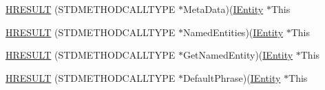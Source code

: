 \begin{DoxyCompactItemize}
\item 
\hyperlink{struct_i_entity_vtbl_aa0ba25fab034e9859b51e790274c795a}{H\+R\+E\+S\+U\+LT} (S\+T\+D\+M\+E\+T\+H\+O\+D\+C\+A\+L\+L\+T\+Y\+PE $\ast$Meta\+Data)(\hyperlink{structuredquery_8h_a9dd08456b6bfe208b5aa2ea5c533b490}{I\+Entity} $\ast$This
\item 
\hyperlink{struct_i_entity_vtbl_a513e110e6fd4b67ebf4ed83cce6cb267}{H\+R\+E\+S\+U\+LT} (S\+T\+D\+M\+E\+T\+H\+O\+D\+C\+A\+L\+L\+T\+Y\+PE $\ast$Named\+Entities)(\hyperlink{structuredquery_8h_a9dd08456b6bfe208b5aa2ea5c533b490}{I\+Entity} $\ast$This
\item 
\hyperlink{struct_i_entity_vtbl_a439e174a7e536dd50845dcedb2162d35}{H\+R\+E\+S\+U\+LT} (S\+T\+D\+M\+E\+T\+H\+O\+D\+C\+A\+L\+L\+T\+Y\+PE $\ast$Get\+Named\+Entity)(\hyperlink{structuredquery_8h_a9dd08456b6bfe208b5aa2ea5c533b490}{I\+Entity} $\ast$This
\item 
\hyperlink{struct_i_entity_vtbl_a27731a69b52d4cb337f4cccc3161b206}{H\+R\+E\+S\+U\+LT} (S\+T\+D\+M\+E\+T\+H\+O\+D\+C\+A\+L\+L\+T\+Y\+PE $\ast$Default\+Phrase)(\hyperlink{structuredquery_8h_a9dd08456b6bfe208b5aa2ea5c533b490}{I\+Entity} $\ast$This
\end{DoxyCompactItemize}
